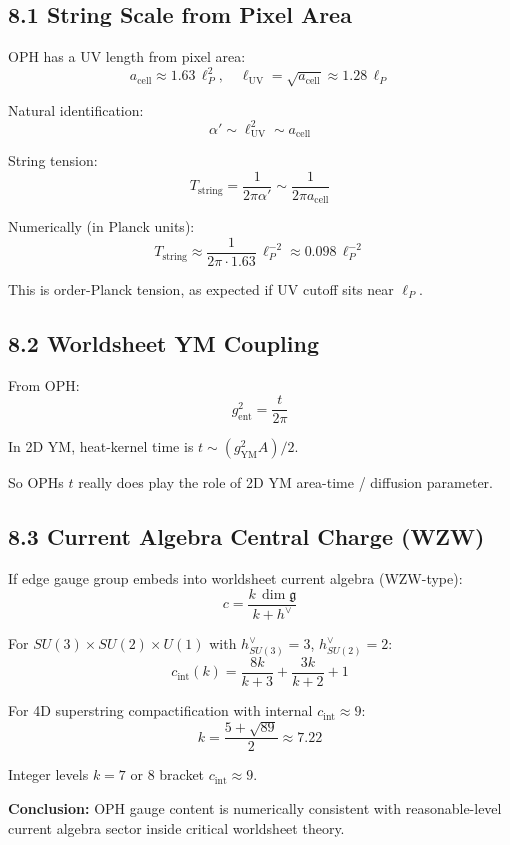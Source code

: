 \subsection{8.1 String Scale from Pixel Area}\label{81-string-scale-from-pixel-area}

OPH has a UV length from pixel area: \[a_{\text{cell}} \approx 1.63 \, \ell_P^2, \quad \ell_{\text{UV}} = \sqrt{a_{\text{cell}}} \approx 1.28 \, \ell_P\]

Natural identification: \[\alpha' \sim \ell_{\text{UV}}^2 \sim a_{\text{cell}}\]

String tension: \[T_{\text{string}} = \frac{1}{2\pi\alpha'} \sim \frac{1}{2\pi a_{\text{cell}}}\]

Numerically (in Planck units): \[T_{\text{string}} \approx \frac{1}{2\pi \cdot 1.63} \, \ell_P^{-2} \approx 0.098 \, \ell_P^{-2}\]

This is order-Planck tension, as expected if UV cutoff sits near \(\ell_P\).

\subsection{8.2 Worldsheet YM Coupling}\label{82-worldsheet-ym-coupling}

From OPH: \[g_{\text{ent}}^2 = \frac{t}{2\pi}\]

In 2D YM, heat-kernel time is \(t \sim (g_{\text{YM}}^2 A)/2\).

So OPH\textquotesingle s \(t\) really does play the role of 2D YM area-time / diffusion parameter.

\subsection{8.3 Current Algebra Central Charge (WZW)}\label{83-current-algebra-central-charge-wzw}

If edge gauge group embeds into worldsheet current algebra (WZW-type): \[c = \frac{k \, \dim\mathfrak{g}}{k + h^\vee}\]

For \(SU(3) \times SU(2) \times U(1)\) with \(h^\vee_{SU(3)} = 3\), \(h^\vee_{SU(2)} = 2\): \[c_{\text{int}}(k) = \frac{8k}{k+3} + \frac{3k}{k+2} + 1\]

For 4D superstring compactification with internal \(c_{\text{int}} \approx 9\): \[k = \frac{5 + \sqrt{89}}{2} \approx 7.22\]

Integer levels \(k = 7\) or \(8\) bracket \(c_{\text{int}} \approx 9\).

\textbf{Conclusion:} OPH gauge content is numerically consistent with reasonable-level current algebra sector inside critical worldsheet theory.

